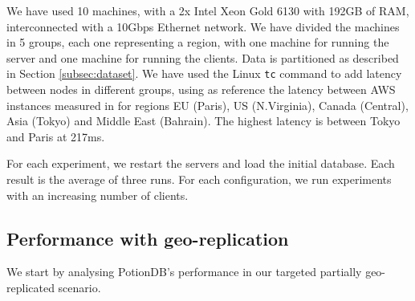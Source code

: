 \documentclass[sigplan,twocolumn,review,anonymous]{acmart}
\begin{document}



We have used 10 machines, with a 2x Intel Xeon Gold 6130 with 192GB of RAM, interconnected with a 10Gbps Ethernet network. 
We have divided the machines in 5 groups,  each one representing a region, with one machine for running the server and one machine for running the clients.  
Data is partitioned as described in Section \ref{subsec:dataset}. 
We have used the Linux \texttt{tc} command to add latency between nodes in different groups, using as reference the latency between AWS instances measured in \cite{AWSLatency} for regions EU (Paris), US (N.Virginia), Canada (Central), Asia (Tokyo) and Middle East (Bahrain). The highest latency is between Tokyo and Paris at 217ms.  

For each experiment, we restart the servers and load the initial database. 
Each result is the average of three runs. 
For each configuration, we run experiments with an increasing number of clients. 



\subsection{Performance with geo-replication}

We start by analysing PotionDB's performance in our targeted partially geo-replicated scenario.
\end{document}
